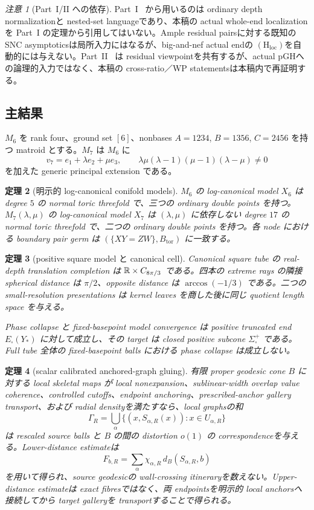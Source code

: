 \documentclass[11pt,a4paper]{ltjsarticle}
\newcommand{\Sigplus}{\Sigma_{\square}^{+}}
\newcommand{\Hloc}{\ensuremath{(\mathrm H_{\mathrm{loc}})}}
\theoremstyle{plain}
\newtheorem{theorem}{定理}[section]\newtheorem{proposition}[theorem]{命題}
\theoremstyle{definition}
\theoremstyle{remark}
\newtheorem{remark}[theorem]{注意}\newtheorem{warning}[theorem]{警告}
\begin{document}
\begin{remark}[Part~I/II への依存]
Part~I~\cite{UedaI} から用いるのは ordinary depth normalizationと nested-set languageであり、本稿の actual whole-end localizationを Part~I の定理から引用してはいない。Ample residual pairsに対する既知の SNC asymptoticsは局所入力にはなるが、big-and-nef actual endの \Hloc を自動的には与えない。Part~II~\cite{UedaII} は residual viewpointを共有するが、actual pGHへの論理的入力ではなく、本稿の cross-ratio／WP statementsは本稿内で再証明する。
\end{remark}

\subsection{主結果}
$M_6$ を rank four、ground set $[6]$、nonbases $A=1234$, $B=1356$, $C=2456$ を持つ matroid とする。$M_7$ は $M_6$ に
\[
 v_7=e_1+\lambda e_2+\mu e_3,
 \qquad \lambda\mu(\lambda-1)(\mu-1)(\lambda-\mu)\ne0
\]
を加えた generic principal extension である。

\begin{theorem}[明示的 log-canonical conifold models]\label{thm:intro-algebraic}
$M_6$ の log-canonical model $X_6$ は degree $5$ の normal toric threefold で、三つの ordinary double points を持つ。$M_7(\lambda,\mu)$ の log-canonical model $X_7$ は $(\lambda,\mu)$ に依存しない degree $17$ の normal toric threefold で、二つの ordinary double points を持つ。各 node における boundary pair germ は $(\{XY=ZW\},B_{\mathrm{tor}})$ に一致する。
\end{theorem}

\begin{theorem}[positive square model と canonical cell]\label{thm:intro-square}
Canonical square tube の real-depth translation completion は $\mathbb R\times C_{8\pi/3}$ である。四本の extreme rays の隣接 spherical distance は $\pi/2$、opposite distance は $\arccos(-1/3)$ である。二つの small-resolution presentations は kernel leaves を商した後に同じ quotient length space を与える。

Phase collapse と fixed-basepoint model convergence は positive truncated end $E_{\square}(Y_*)$ に対して成立し、その target は closed positive subcone $\Sigplus$ である。Full tube 全体の fixed-basepoint balls における phase collapse は成立しない。
\end{theorem}

\begin{theorem}[scalar calibrated anchored-graph gluing]\label{thm:intro-calibration}
有限 proper geodesic cone $B$ に対する local skeletal maps が local nonexpansion、sublinear-width overlap value coherence、controlled cutoffs、endpoint anchoring、prescribed-anchor gallery transport、および radial densityを満たすなら、local graphsの和
\[
 \Gamma_R=\bigcup_\alpha\{(x,S_{\alpha,R}(x)):x\in U_{\alpha,R}\}
\]
は rescaled source balls と $B$ の間の distortion $o(1)$ の correspondenceを与える。Lower-distance estimateは
\[
 F_{b,R}=\sum_\alpha\chi_{\alpha,R}\,d_B(S_{\alpha,R},b)
\]
を用いて得られ、source geodesicの wall-crossing itineraryを数えない。Upper-distance estimateは exact fibresではなく、両 endpointsを明示的 local anchorsへ接続してから target galleryを transportすることで得られる。
\end{theorem}
\end{document}

